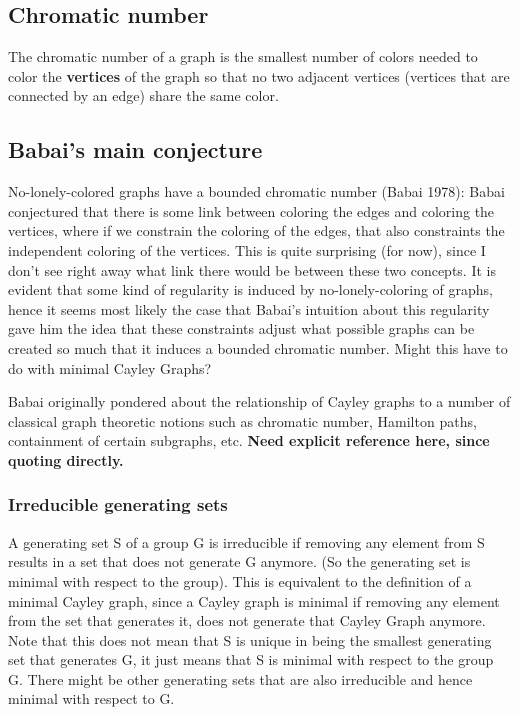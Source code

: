 \documentclass[a4paper,10pt]{article}
\numberwithin{equation}{section}
\theoremstyle{definition}
\begin{document}
    \subsection{Chromatic number}
        The chromatic number of a graph is the smallest number of colors needed to color the \textbf{vertices} of the graph so that no two adjacent vertices (vertices that are connected by an edge) share the same color.
    \subsection{Babai's main conjecture}
        No-lonely-colored graphs have a bounded chromatic number (Babai 1978):
        Babai conjectured that there is some link between coloring the edges and coloring the vertices, where if we constrain the coloring of the edges, that also constraints the independent coloring of the vertices. This is quite surprising (for now), since
        I don't see right away what link there would be between these two concepts. It is evident that some kind of regularity is induced by no-lonely-coloring of graphs, hence it seems most likely the case that Babai's intuition about this regularity gave him
        the idea that these constraints adjust what possible graphs can be created so much that it induces a bounded chromatic number. Might this have to do with minimal Cayley Graphs?

        Babai originally pondered about the relationship of Cayley graphs to a number of classical graph theoretic notions such as chromatic number, Hamilton paths, containment of certain subgraphs, etc. \textbf{Need explicit reference here, since quoting directly.}

        \subsubsection{Irreducible generating sets}
            A generating set S of a group G is irreducible if removing any element from S results in a set that does not generate G anymore. (So the generating set is minimal with respect to the group).
            This is equivalent to the definition of a minimal Cayley graph, since a Cayley graph is minimal if removing any element from the set that generates it, does not generate that Cayley Graph anymore.
            Note that this does not mean that S is unique in being the smallest generating set that generates G, it just means that S is minimal with respect to the group G. There might be other generating sets that are also irreducible and hence minimal with respect to G.
\end{document}
